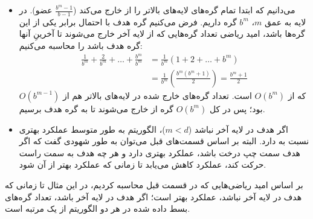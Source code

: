 \begin{ابجد}
\begin{itemize}
\begin{itemize}
\begin{itemize}
\begin{align*}
                          \end{align*}
                  \end{itemize}
                  این دو مقدار را از نظر اردر جمع می‌زنیم:
                  \begin{align*}
                      O(\frac{m+1}{2} + \frac{b^{m+1}-1}{2(b-1)}) + O(\frac{b(b^m-1)(b^{d-m}-1)}{2(b-1)}) & = O(m + b^m + b^d) \\
                      \xRightarrow{m \leq d}                                                              & = O(b^d)
                  \end{align*}
              \item[] می‌دانیم که  ابتدا تمام گره‌های لایه‌های بالاتر را از  خارج می‌کند ($\frac{b^m - 1}{b - 1}$ عضو). در لایه به عمق $m$، $b^m$ گره داریم. فرض می‌کنیم گره هدف با احتمال برابر یکی از این گره‌ها باشد، امید ریاضی تعداد گره‌هایی که از لایه آخر خارج می‌شوند تا آخرینِ آنها گره هدف باشد را محاسبه می‌کنیم:
                  \begin{align*}
                      \frac{1}{b^m} + \frac{2}{b^m} + \dots + \frac{b^m}{b^m} & = \frac{1}{b^m}(1 + 2 + \dots + b^m)                        \\
                                                                              & = \frac{1}{b^m}(\frac{b^m(b^m + 1)}{2}) = \frac{b^m + 1}{2}
                  \end{align*}
                  که از $O(b^m)$ است. تعداد گره‌های خارج شده در لایه‌های بالاتر هم از $O(b^{m-1})$ بود؛ پس در کل $O(b^m)$ گره از  خارج می‌شوند تا به گره هدف برسیم.
              \item[] اگر هدف در لایه آخر نباشد ($m<d$)، الگوریتم  به طور متوسط عملکرد بهتری نسبت به  دارد. البته بر اساس قسمت‌های قبل می‌توان به طور شهودی گفت که اگر هدف سمت چپ درخت باشد،  عملکرد بهتری دارد و هر چه هدف به سمت راست حرکت کند، عملکرد  کاهش می‌یابد تا زمانی که عملکرد  بهتر از آن شود.
          \end{itemize}
\end{itemize}

\item بر اساس امید ریاضی‌هایی که در قسمت قبل محاسبه کردیم، در این مثال تا زمانی که هدف در لایه آخر نباشد، عملکرد  بهتر است؛ اگر هدف در لایه آخر باشد، تعداد گره‌های بسط داده شده در هر دو الگوریتم از یک مرتبه است.

\end{ابجد}